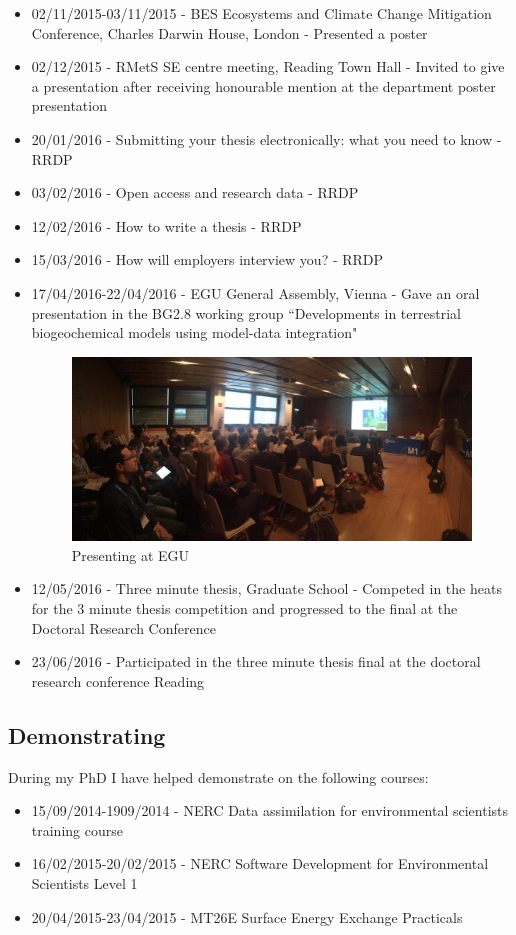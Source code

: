 \documentclass[11pt]{article}
\begin{document}
\begin{itemize}
\item 02/11/2015-03/11/2015 - BES Ecosystems and Climate Change Mitigation Conference, Charles Darwin House, London - Presented a poster

\item 02/12/2015 - RMetS SE centre meeting, Reading Town Hall - Invited to give a presentation after receiving honourable mention at the department poster presentation

\item 20/01/2016 - Submitting your thesis electronically: what you need to know - RRDP

\item 03/02/2016 - Open access and research data - RRDP

\item 12/02/2016 - How to write a thesis - RRDP

\item 15/03/2016 - How will employers interview you? - RRDP

\item 17/04/2016-22/04/2016 - EGU General Assembly, Vienna - Gave an oral presentation in the BG2.8 working group ``Developments in terrestrial biogeochemical models using model-data integration"

\begin{figure}[!ht]
    \centering
    \includegraphics[width=.4\textwidth]{egu2.jpg}
    \caption{Presenting at EGU}
    \label{fig:egu}
\end{figure}

\item 12/05/2016 - Three minute thesis, Graduate School - Competed in the heats for the 3 minute thesis competition and progressed to the final at the Doctoral Research Conference

\item 23/06/2016 - Participated in the three minute thesis final at the doctoral research conference Reading
\end{itemize}



\subsection{Demonstrating}
During my PhD I have helped demonstrate on the following courses:
\begin{itemize}
\item 15/09/2014-1909/2014 - NERC Data assimilation for environmental scientists training course

\item 16/02/2015-20/02/2015 - NERC Software Development for Environmental Scientists Level 1

\item 20/04/2015-23/04/2015 - MT26E Surface Energy Exchange Practicals
\end{itemize}


{}
%
\end{document}
